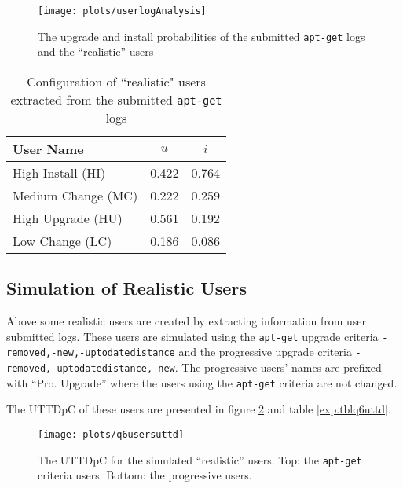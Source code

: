 \begin{figure}[htp]
\begin{center}
  \texttt{[image: plots/userlogAnalysis]}
  \caption{The upgrade and install probabilities of the submitted \texttt{apt-get} logs and the ``realistic'' users}
  \label{exp.figuserlogs}
\end{center}
\end{figure}

\begin{table}[h!]
\centering
\begin{tabular}{|l | c | c | }
\hline
User Name 				& 	$u$ 		& $i$ 		\\ \hline
High Install (HI)			& 0.422			& 0.764 	\\
Medium Change (MC)			& 0.222			& 0.259 	\\
High Upgrade (HU)			& 0.561			& 0.192		\\
Low Change 	(LC)			& 0.186			& 0.086 	\\ \hline
\end{tabular}
\caption{Configuration of ``realistic" users extracted from the submitted \texttt{apt-get} logs}
\label{exp.tbluserlogs}
\end{table}

\subsection{Simulation of Realistic Users}
\label{exp.q4}
Above some realistic users are created by extracting information from user submitted logs.
These users are simulated using the \texttt{apt-get} upgrade criteria \texttt{-removed,-new,-uptodatedistance} and the progressive upgrade criteria \texttt{-removed,-uptodatedistance,-new}.
The progressive users' names are prefixed  with ``Pro. Upgrade'' where the users using the \texttt{apt-get} criteria are not changed.

The UTTDpC of these users are presented in figure \ref{exp.q6uttdpc} and table \ref{exp.tblq6uttd}.
\begin{figure}[htp]
\begin{center}
  \texttt{[image: plots/q6usersuttd]}
  \caption{The UTTDpC for the simulated ``realistic'' users. Top: the \texttt{apt-get} criteria users. Bottom: the progressive users.}
  \label{exp.q6uttdpc}
\end{center}
\end{figure}

